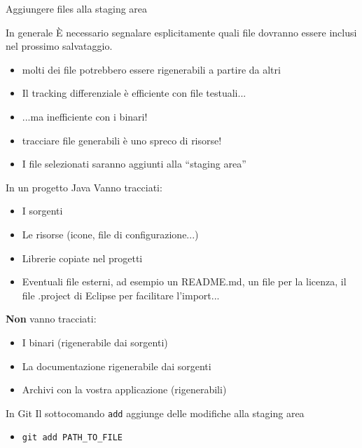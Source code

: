 \documentclass[xcolor=dvipsnames,presentation]{beamer}
\begin{document}
\begin{frame}{Aggiungere files alla staging area}
    \begin{block}{In generale}
        È necessario segnalare esplicitamente quali file dovranno essere inclusi nel prossimo
salvataggio.
        \begin{itemize}
            \item molti dei file potrebbero essere rigenerabili a partire da altri
            \item Il tracking differenziale è efficiente con file testuali...
            \item ...ma inefficiente con i binari!
            \item tracciare file generabili è uno spreco di risorse!
            \item I file selezionati saranno aggiunti alla ``staging area''
        \end{itemize}
    \end{block}
    \begin{block}{In un progetto Java}
        Vanno tracciati:
        \begin{itemize}
            \item I sorgenti
            \item Le risorse (icone, file di configurazione...)
            \item Librerie copiate nel progetti
            \item Eventuali file esterni, ad esempio un README.md, un file per la licenza, il file .project di Eclipse per facilitare l'import...
        \end{itemize}
        \textbf{Non} vanno tracciati:
        \begin{itemize}
            \item I binari (rigenerabile dai sorgenti)
            \item La documentazione rigenerabile dai sorgenti
            \item Archivi con la vostra applicazione (rigenerabili)
        \end{itemize}
    \end{block}
    \begin{block}{In Git}
        Il sottocomando \texttt{add} aggiunge delle modifiche alla staging area
        \begin{itemize}
            \item \texttt{git add PATH\_TO\_FILE}
            \begin{itemize}

\end{itemize}
\end{itemize}
\end{block}
\end{frame}
\end{document}
